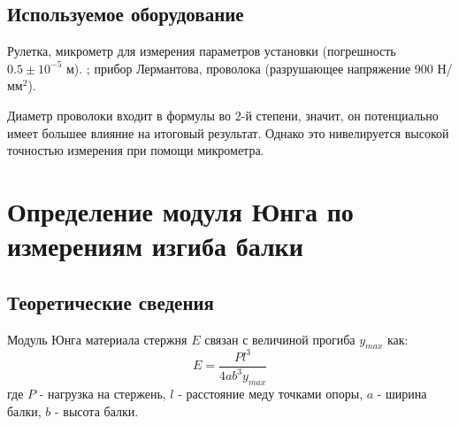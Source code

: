 \documentclass[12pt]{article}
\begin{document}
    \subsection{Используемое оборудование}
    Рулетка, микрометр для измерения параметров установки (погрешность
    $0.5\pm10^{-5}$ м).
    ; прибор Лермантова, проволока
    (разрушающее напряжение 900 Н/мм$^2$).
    \par Диаметр проволоки входит в формулы во 2-й степени, значит,
    он потенциально имеет большее влияние на итоговый результат.
    Однако это нивелируется высокой точностью измерения при помощи
    микрометра.

    \section{Определение модуля Юнга по измерениям изгиба балки}
    \subsection{Теоретические сведения}
    Модуль Юнга материала стержня $E$ связан с величиной
    прогиба $y_{max}$ как:
    \begin{equation}\label{balka}
        E=\frac{Pl^3}{4ab^3y_{max}}
    \end{equation}
    где $P$ - нагрузка на стержень, $l$ - расстояние меду точками опоры,
    $a$ - ширина балки, $b$ - высота балки.
\end{document}
